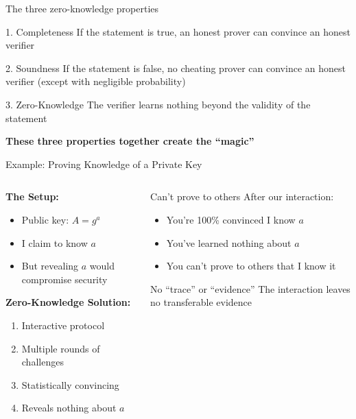 \documentclass[aspectratio=169, lualatex, handout]{beamer}
\begin{document}
\begin{frame}{The three zero-knowledge properties}
	\begin{block}{1. Completeness}
		If the statement is true, an honest prover can convince an honest verifier
	\end{block}
	\begin{block}{2. Soundness}
		If the statement is false, no cheating prover can convince an honest verifier (except with negligible probability)
	\end{block}
	\begin{block}{3. Zero-Knowledge}
		The verifier learns nothing beyond the validity of the statement
	\end{block}
	\vspace{0.25em}
	\begin{center}
		\textbf{These three properties together create the ``magic''}
	\end{center}
\end{frame}

\begin{frame}{Example: Proving Knowledge of a Private Key}
	\begin{columns}[c]
		\begin{column}{0.5\textwidth}
			\textbf{The Setup:}
			\begin{itemize}
				\item Public key: $A = g^{a}$
				\item I claim to know $a$
				\item But revealing $a$ would compromise security
			\end{itemize}
			\textbf{Zero-Knowledge Solution:}
			\begin{enumerate}
				\item Interactive protocol
				\item Multiple rounds of challenges
				\item Statistically convincing
				\item Reveals nothing about $a$
			\end{enumerate}
		\end{column}
		\begin{column}{0.5\textwidth}
			\begin{alertblock}{Can't prove to others}
				After our interaction:
				\begin{itemize}
					\item You're 100\% convinced I know $a$
					\item You've learned nothing about $a$
					\item You can't prove to others that I know it
				\end{itemize}
			\end{alertblock}
			\vspace{0.5em}
			\begin{exampleblock}{No ``trace'' or ``evidence''}
				The interaction leaves no transferable evidence
			\end{exampleblock}
		\end{column}
	\end{columns}
\end{frame}
\end{document}
